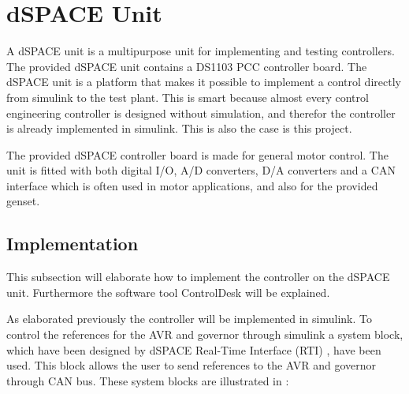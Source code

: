 \section{dSPACE Unit}

A dSPACE unit is a multipurpose unit for implementing and testing controllers. The provided dSPACE unit contains a DS1103 PCC controller board.  %
The dSPACE unit is a platform that makes it possible to implement a control directly from simulink to the test plant. This is smart because almost every control engineering controller is designed without simulation, and therefor the controller is already implemented in simulink. This is also the case is this project. 

The provided dSPACE controller board is made for general motor control. The unit is fitted with both digital I/O, A/D converters, D/A converters and a CAN interface which is often used in motor applications, and also for the provided genset. 


\subsection{Implementation}
\label{dspace_unitv2}

This subsection will elaborate how to implement the controller on the dSPACE unit. Furthermore the software tool ControlDesk will be explained. 

As elaborated previously the controller will be implemented in simulink. To control the references for the AVR and governor through simulink a system block, which have been designed by dSPACE Real-Time Interface (RTI) \cite{dSPACE_software}, have been used. This block allows the user to send references to the AVR and governor through CAN bus. These system blocks are illustrated in :

